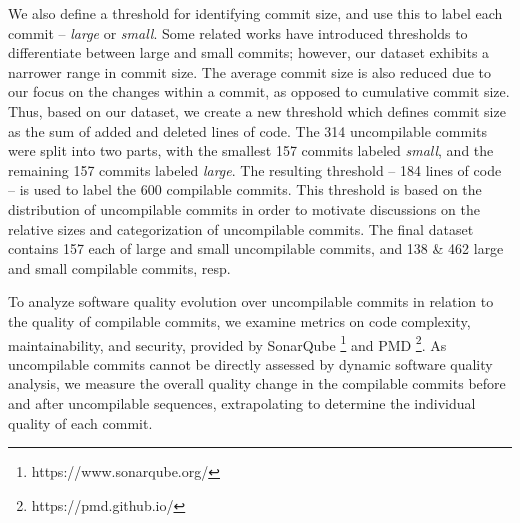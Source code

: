 We also define a threshold for identifying commit size, and use this to label each commit -- \textit{large} or \textit{small}. 
Some related works have introduced thresholds to differentiate between large and small commits; however, our dataset exhibits a narrower range in commit size. 
The average commit size is also reduced due to our focus on the changes within a commit, as opposed to cumulative commit size. 
Thus, based on our dataset, we create a new threshold which defines commit size as the sum of added and deleted lines of code. The 314 uncompilable commits were split into two parts, with the smallest 157 commits labeled \textit{small}, and the remaining 157 commits labeled \textit{large}. 
The resulting threshold -- 184 lines of code -- is used to label the 600 compilable commits.
This threshold is based on the distribution of uncompilable commits in order to motivate discussions on the relative sizes and categorization of uncompilable commits. The final dataset contains 157 each of large and small uncompilable commits, and 138 \& 462 large and small compilable commits, resp.

To analyze software quality evolution over uncompilable commits in relation to the quality of compilable commits, we examine metrics on code complexity, maintainability, and security, provided by SonarQube \footnote{https://www.sonarqube.org/} and PMD \footnote{https://pmd.github.io/}. As uncompilable commits cannot be directly assessed by dynamic software quality analysis, we measure the overall quality change in the compilable commits before and after uncompilable sequences, extrapolating to determine the individual quality of each commit. 
